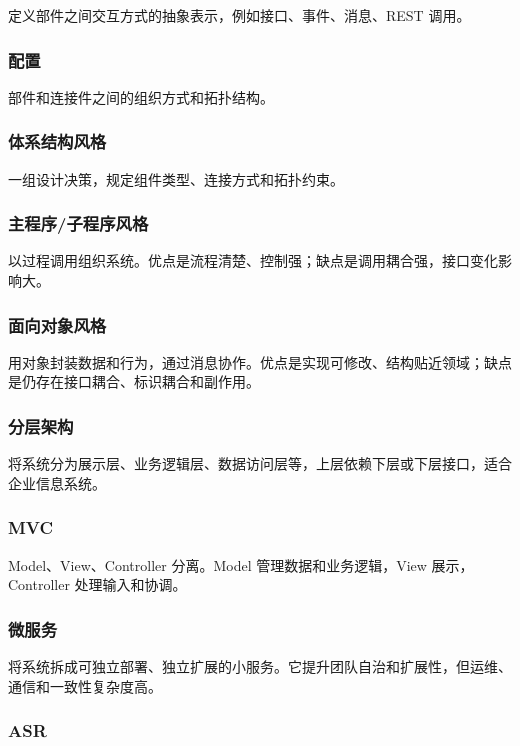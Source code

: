 \documentclass[UTF8,zihao=-4]{ctexart}
\begin{document}
定义部件之间交互方式的抽象表示，例如接口、事件、消息、REST 调用。


\subsubsection*{配置}


部件和连接件之间的组织方式和拓扑结构。


\subsubsection*{体系结构风格}


一组设计决策，规定组件类型、连接方式和拓扑约束。


\subsubsection*{主程序/子程序风格}


以过程调用组织系统。优点是流程清楚、控制强；缺点是调用耦合强，接口变化影响大。


\subsubsection*{面向对象风格}


用对象封装数据和行为，通过消息协作。优点是实现可修改、结构贴近领域；缺点是仍存在接口耦合、标识耦合和副作用。


\subsubsection*{分层架构}


将系统分为展示层、业务逻辑层、数据访问层等，上层依赖下层或下层接口，适合企业信息系统。


\subsubsection*{MVC}


Model、View、Controller 分离。Model 管理数据和业务逻辑，View 展示，Controller 处理输入和协调。


\subsubsection*{微服务}


将系统拆成可独立部署、独立扩展的小服务。它提升团队自治和扩展性，但运维、通信和一致性复杂度高。


\subsubsection*{ASR}
\end{document}
